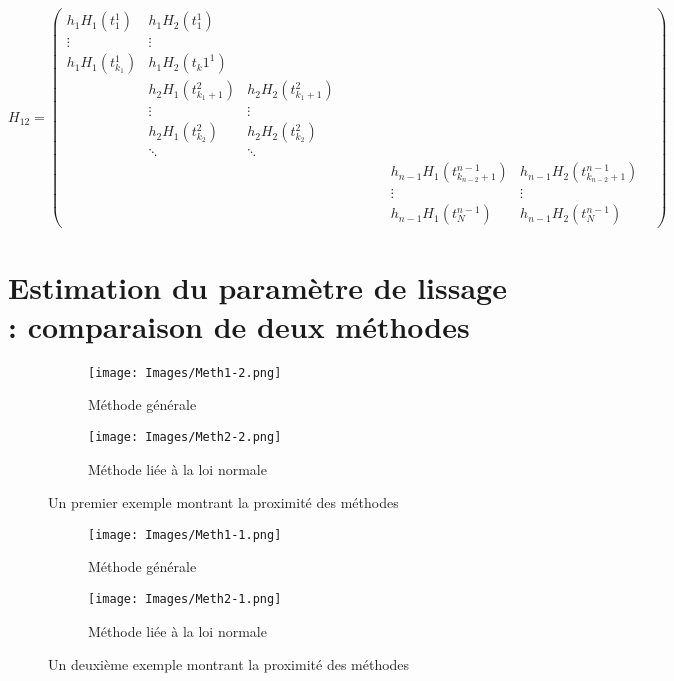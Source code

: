 \documentclass[a4paper,12pt]{article} %
\begin{document}
                
                $$H_{12}=\begin{pmatrix} h_1H_1(t_1^1)&h_1H_2(t_1^1)& & & & & & & &  \\ \vdots&\vdots& & & & & & &  \\ h_1H_1(t_{k_1}^1)&h_1H_2(t_k1^1)& & & & & & & \\ &h_2H_1(t_{{k_1}+1}^2)&h_2H_2(t_{{k_1}+1}^2)& & & & & &   \\ &\vdots&\vdots& & & & & &  \\ &h_2H_1(t_{k_2}^2)&h_2H_2(t_{k_2}^2)& & & & & & \\ &\ddots&\ddots & & & & & & & \\ & & & & & & &h_{n-1}H_1(t_{{k_{n-2}}+1}^{n-1}) &h_{n-1}H_2(t_{{k_{n-2}}+1}^{n-1})\\ & & & & & & &\vdots &\vdots\\ & & & & & & &h_{n-1}H_1(t_N^{n-1}) &h_{n-1}H_2(t_N^{n-1}) \end{pmatrix}$$
                
    \section{\label{annexe4}Estimation du paramètre de lissage : comparaison de deux méthodes}
        \begin{figure}[H]
            \centering
            \begin{subfigure}{.5\textwidth}
              \centering
              \texttt{[image: Images/Meth1-2.png]}
              \caption{Méthode générale}
              \label{fig:sub1}
            \end{subfigure}%
            \begin{subfigure}{.5\textwidth}
              \centering
              \texttt{[image: Images/Meth2-2.png]}
              \caption{Méthode liée à la loi normale}
              \label{fig:sub2}
            \end{subfigure}
            \caption{Un premier exemple montrant la proximité des méthodes}
            \label{fig:test}
        \end{figure}
        
        \begin{figure}[H]
            \centering
            \begin{subfigure}{.5\textwidth}
              \centering
              \texttt{[image: Images/Meth1-1.png]}
              \caption{Méthode générale}
              \label{fig:sub1}
            \end{subfigure}%
            \begin{subfigure}{.5\textwidth}
              \centering
              \texttt{[image: Images/Meth2-1.png]}
              \caption{Méthode liée à la loi normale}
              \label{fig:sub2}
            \end{subfigure}
            \caption{Un deuxième exemple montrant la proximité des méthodes}
            \label{fig:test}
        \end{figure}
    
\end{document}
